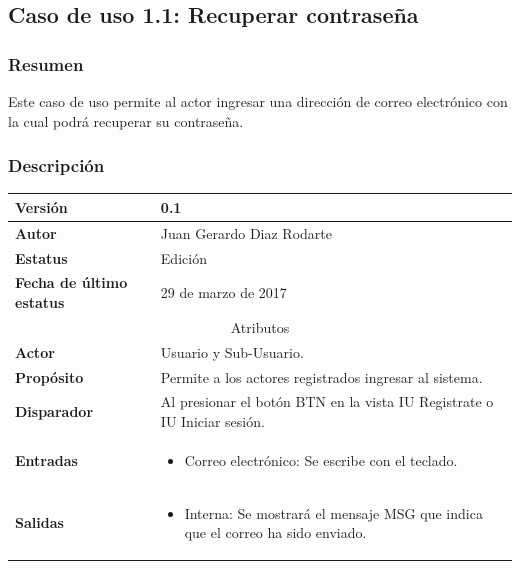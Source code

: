 \subsection{Caso de uso 1.1: Recuperar contraseña} \label{cu1_1}
\subsubsection{Resumen}
Este caso de uso permite al actor ingresar una dirección de correo electrónico con la cual podrá recuperar su contraseña.
\subsubsection{Descripción}
\begingroup
\setlength{\LTleft}{-10cm plus -1fill}
\setlength{\LTright}{\LTleft}
\begin{center}
    \addtocounter{table}{-1}
     \label{tab:cu1_1_tab}
	\begin{longtable}{| p{3.5cm} | p{11.5cm} |}
      	\hline
      		\textbf{Versión} &  0.1 \\
        \hline 
       		\textbf{Autor} & Juan Gerardo Diaz Rodarte\\
        \hline
          \textbf{Estatus} & Edición \\
        \hline  
          \textbf{Fecha de último estatus} & 29 de marzo de 2017 \\
        \hline
      \multicolumn{2}{|c|}{\large{Atributos}} \\
        \hline
          \textbf{Actor} & Usuario y Sub-Usuario. \\
        \hline	
          \textbf{Propósito} & Permite a los actores registrados ingresar al sistema. \\
        \hline
          \textbf{Disparador} & Al presionar el botón BTN en la vista IU Registrate o IU Iniciar sesión. \\
        \hline	
          \textbf{Entradas} & 
            \begin{itemize}
              \item Correo electrónico: Se escribe con el teclado.
            \end{itemize} \\
        \hline	
          \textbf{Salidas} & 
            \begin{itemize}
              \item Interna: Se mostrará el mensaje MSG que indica que el correo ha sido enviado.
            \end{itemize} \\

\end{longtable}
\end{center}
